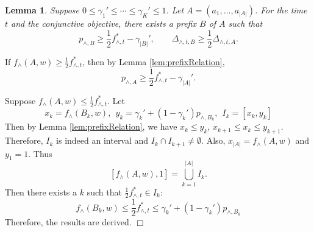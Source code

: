 \documentclass{article}
\newcommand{\abs}[1]{\left| #1 \right|}
\newtheorem{lemma}[theorem]{Lemma}%
\newenvironment{proof}{\noindent {\textbf{Proof. }}}{$\Box$ \medskip}
\begin{document}
\begin{lemma}
Suppose $0 \leq \gamma_1' \leq \cdots \leq \gamma_K' \leq 1$. Let $A = (a_1, ..., a_{\abs{A}})$. For the time $t$ and the conjunctive objective, there exists a prefix $B$ of $A$ such that 
$$
p_{\wedge, B} \geq \frac{1}{2}f_{\wedge, t}^{\ast} - \gamma_{\abs{B}}', \qquad \Delta_{\wedge, t, B} \geq \frac{1}{2}\Delta_{\wedge, t, A}.
$$ 
\end{lemma}
\begin{proof}
If $f_{\wedge}(A, w) \geq \frac{1}{2} f_{\wedge, t}^{\ast}$, then by Lemma \ref{lem:prefixRelation},
$$
p_{\wedge, A} \geq \frac{1}{2}f_{\wedge, t}^{\ast} - \gamma_{\abs{A}}'.
$$

Suppose $f_{\wedge}(A, w) \leq \frac{1}{2} f_{\wedge, t}^{\ast}$. Let
$$
x_k = f_{\wedge}(B_k,w), ~~ y_k = \gamma_k' + (1 - \gamma_k')p_{\wedge, B_k}, ~~I_k = [x_k, y_k]
$$
Then by Lemma \ref{lem:prefixRelation}, we have $x_k \leq y_k$, $x_{k+1} \leq x_k \leq y_{k+1}$. Therefore, $I_k$ is indeed an interval and $I_k \cap I_{k+1} \neq \emptyset$. Also, $x_{\abs{A}} = f_{\wedge}(A, w)$ and $y_1 = 1$. Thus
$$
[f_{\wedge}(A,w), 1] = \bigcup_{k=1}^{\abs{A}} I_k.
$$
Then there exists a $k$ such that $\frac{1}{2}f_{\wedge, t}^{\ast} \in I_k$:
$$
f_{\wedge}(B_k,w) \leq \frac{1}{2}f_{\wedge, t}^{\ast} \leq \gamma_k' + (1 - \gamma_k')p_{\wedge, B_k}
$$
Therefore, the results are derived.
\end{proof}
\end{document}
